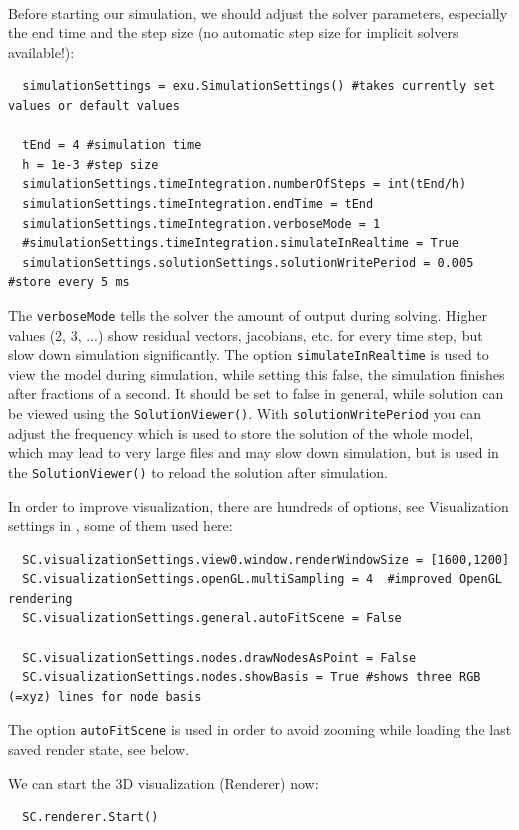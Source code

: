 \horizontalRuler\\
\noindent Before starting our simulation, we should adjust the solver parameters, especially the end time and the step size (no automatic step size for implicit solvers available!):
\pythonstyle\begin{lstlisting}
  simulationSettings = exu.SimulationSettings() #takes currently set values or default values

  tEnd = 4 #simulation time
  h = 1e-3 #step size
  simulationSettings.timeIntegration.numberOfSteps = int(tEnd/h)
  simulationSettings.timeIntegration.endTime = tEnd
  simulationSettings.timeIntegration.verboseMode = 1
  #simulationSettings.timeIntegration.simulateInRealtime = True
  simulationSettings.solutionSettings.solutionWritePeriod = 0.005 #store every 5 ms
\end{lstlisting}
The \texttt{verboseMode} tells the solver the amount of output during solving. Higher values (2, 3, ...) show residual vectors, jacobians, etc. for every time step, but slow down simulation significantly.
The option \texttt{simulateInRealtime} is used to view the model during simulation, while setting this false, 
the simulation finishes after fractions of a second. It should be set to false in general, 
while solution can be viewed using the \texttt{SolutionViewer()}.
With \texttt{solutionWritePeriod} you can adjust the frequency which is used to store the solution of the whole model, 
which may lead to very large files and may slow down simulation, but is used in the \texttt{SolutionViewer()} to reload the solution after simulation.

\noindent In order to improve visualization, there are hundreds of options, see Visualization settings in , some of them used here:
\pythonstyle\begin{lstlisting}
  SC.visualizationSettings.view0.window.renderWindowSize = [1600,1200]
  SC.visualizationSettings.openGL.multiSampling = 4  #improved OpenGL rendering
  SC.visualizationSettings.general.autoFitScene = False

  SC.visualizationSettings.nodes.drawNodesAsPoint = False
  SC.visualizationSettings.nodes.showBasis = True #shows three RGB (=xyz) lines for node basis
\end{lstlisting}
The option \texttt{autoFitScene} is used in order to avoid zooming while loading the last saved render state, see below.

\noindent We can start the 3D visualization (Renderer) now:
\pythonstyle\begin{lstlisting}
  SC.renderer.Start()
\end{lstlisting}

